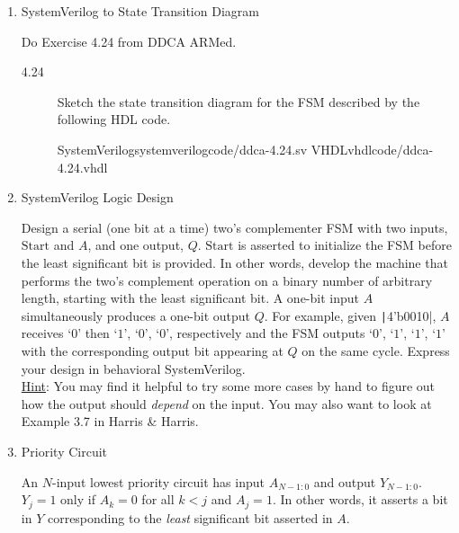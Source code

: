 \documentclass{../../e85}
\date{2019}
\author{}
\begin{document}
\begin{enumerate}
\item SystemVerilog to State Transition Diagram

  Do Exercise 4.24 from DDCA ARMed.

  \begin{description}
  \item[4.24] Sketch the state transition diagram for the FSM
    described by the following HDL code.
    \begin{center}
      \twocolumnlisting
      {SystemVerilog}{systemverilog}{code/ddca-4.24.sv}
      {VHDL}{vhdl}{code/ddca-4.24.vhdl}
    \end{center}

    \begin{solution}
    \end{solution}
  \end{description}

\item SystemVerilog Logic Design

  Design a serial (one bit at a time) two's complementer FSM with two
  inputs, \(\mathrm{Start}\) and \(A\), and one output, \(Q\).
  \(\mathrm{Start}\) is asserted to initialize the FSM before the
  least significant bit is provided.  In other words, develop the
  machine that performs the two's complement operation on a binary
  number of arbitrary length, starting with the least significant bit.
  A one-bit input \(A\) simultaneously produces a one-bit output
  \(Q\).  For example, given \texttt|4'b0010|,
  \(A\) receives `\(0\)' then `\(1\)', `\(0\)', `\(0\)', respectively
  and the FSM outputs `\(0\)', `\(1\)', `\(1\)', `\(1\)' with the
  corresponding output bit appearing at \(Q\) on the same cycle.
  Express your design in behavioral SystemVerilog. \\
  \ul{Hint}: You may find it helpful to try some more cases by hand to
  figure out how the output should \emph{depend} on the input.  You
  may also want to look at Example 3.7 in Harris \& Harris.

  \begin{solution}
  \end{solution}

\item Priority Circuit

  An \(N\)-input lowest priority circuit has input \(A_{N-1:0}\) and
  output \(Y_{N-1:0}\).  \(Y_j = 1\) only if \(A_k = 0\) for all
  \(k<j\) and \(A_j = 1\).  In other words, it asserts a bit in \(Y\)
  corresponding to the \emph{least} significant bit asserted in \(A\).


\end{enumerate}
\end{document}
